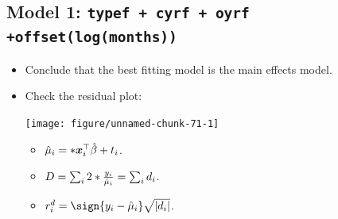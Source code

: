 \documentclass{article}\usepackage[]{graphicx}\usepackage[svgnames]{xcolor}
\newenvironment{knitrout}{}{} %
\let\exp\relax%
\let\log\relax%
\DeclarePairedDelimiter\abs{\lvert}{\rvert}
\providecommand{\Vector}[1]{\bm{#1}}%
\begin{document}
\subsection*{Model 1: \texttt{typef + cyrf + oyrf +offset(log(months))}}
\begin{itemize}
    \item Conclude that the best fitting model is the main effects model.
    \item Check the residual plot:
\begin{knitrout}
\color{fgcolor}

{\centering \texttt{[image: figure/unnamed-chunk-71-1]} 

}


\end{knitrout}
          \begin{itemize}
              \item $ \hat{\mu}_i=\exp*{\Vector{x}_i^\top \hat{\beta}+\log{t_i}} $.
              \item $ D=\sum_{i}2\log*{\frac{y_i}{\hat{\mu}_i}}=\sum_i d_i $.
              \item $ r_i^d=\sign{y_i-\hat{\mu}_i}\sqrt{\abs{d_i}} $.
          \end{itemize}
\end{itemize}
\end{document}
